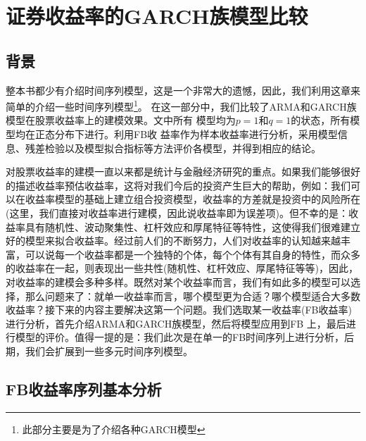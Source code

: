 \chapter{证券收益率的GARCH族模型比较}

\section{背景}
    \par
    整本书都少有介绍时间序列模型，这是一个非常大的遗憾，因此，我们利用这章来简单的介绍一些时间序列模型\footnote{此部分主要是为了介绍各种GARCH模型}。
    在这一部分中，我们比较了ARMA和GARCH族模型在股票收益率上的建模效果。文中所有
    模型均为$p=1$和$q=1$的状态，所有模型均在正态分布下进行。利用FB收
    益率作为样本收益率进行分析，采用模型信息、残差检验以及模型拟合指标等方法评价各模型，并得到相应的结论。
    \par
    对股票收益率的建模一直以来都是统计与金融经济研究的重点。如果我们能够很好的描述收益率预估收益率，这将对我们今后的投资产生巨大的帮助，例如：我们可以在收益率模型的基础上建立组合投资模型，收益率的方差就是投资中的风险所在(这里，我们直接对收益率进行建模，因此说收益率即为误差项)。但不幸的是：收益率具有随机性、波动聚集性、杠杆效应和厚尾特征等特性，这使得我们很难建立好的模型来拟合收益率。经过前人们的不断努力，人们对收益率的认知越来越丰富，可以说每一个收益率都是一个独特的个体，每个个体有其自身的特性，而众多的收益率在一起，则表现出一些共性(随机性、杠杆效应、厚尾特征等等)，因此，对收益率的建模会多种多样。既然对某个收益率而言，我们有如此多的模型可以选择，那么问题来了：就单一收益率而言，哪个模型更为合适？哪个模型适合大多数收益率？接下来的内容主要解决这第一个问题。我们选取某一收益率(FB收益率)进行分析，首先介绍ARMA和GARCH族模型，然后将模型应用到FB 上，最后进行模型的评价。值得一提的是：我们此次是在单一的FB时间序列上进行分析，后期，我们会扩展到一些多元时间序列模型。
\section{FB收益率序列基本分析}
